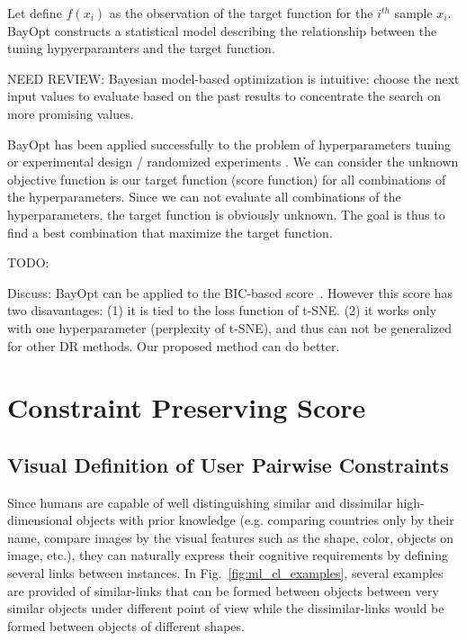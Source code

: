 Let define $f(x_i)$ as the observation of the target function for the $i^{th}$ sample $x_i$.
BayOpt constructs a statistical model describing the relationship between
the tuning hypyerparamters and the target function.

NEED REVIEW: Bayesian model-based optimization is intuitive: choose the next input values to evaluate based on the past results to concentrate the search on more promising values.

BayOpt has been applied successfully to the problem of hyperparameters tuning \cite{snoek2012practical} or experimental design / randomized experiments \cite{letham2019constrained}.
We can consider the unknown objective function is our target function (score function) for all combinations of the hyperparameters.
Since we can not evaluate all combinations of the hyperparameters,
the target function is obviously unknown.
The goal is thus to find a best combination that maximize the target function.

\vspace{8pt} \par
TODO:

Discuss: BayOpt can be applied to the BIC-based score~\cite{cao2017automatic}.
However this score has two disavantages:
(1) it is tied to the loss function of t-SNE.
(2) it works only with one hyperparameter (perplexity of t-SNE), and thus can not be generalized for other DR methods.
Our proposed method can do better.



\section{Constraint Preserving Score}

\subsection{Visual Definition of User Pairwise Constraints}

Since humans are capable of well distinguishing similar and dissimilar high-dimensional objects with prior knowledge (e.g. comparing countries only by their name, compare images by the visual features such as the shape, color, objects on image, etc.), they can naturally express their cognitive requirements by defining several links between instances.
In Fig.~\ref{fig:ml_cl_examples}, several examples are provided of similar-links that can be formed between objects between very similar objects under different point of view while the dissimilar-links would be formed between objects of different shapes.

